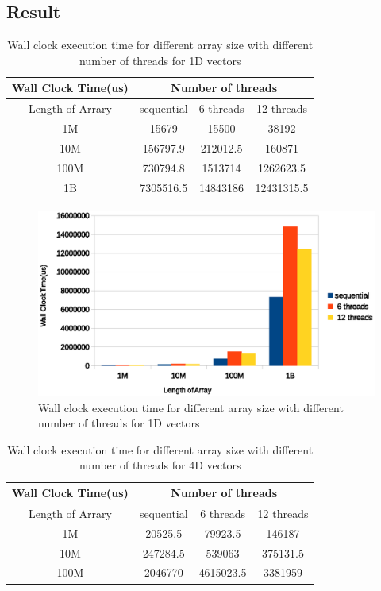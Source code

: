 \documentclass{article}
\begin{document}
\subsection{Result}
\begin{table}[h]
  \centering
  \begin{tabular}{|c|c|c|c|}
    \hline
    Wall Clock Time(us) & \multicolumn{3}{|c|}{Number of threads} \\
    \hline
    Length of Arrary & sequential & 6 threads & 12 threads \\
    \hline
    1M	& 15679	& 15500	& 38192 \\
    \hline
    10M	& 156797.9 & 212012.5 &	160871 \\
    \hline
    100M & 730794.8 & 1513714 &	1262623.5 \\
    \hline
    1B & 7305516.5 & 14843186 &	12431315.5 \\
    \hline
  \end{tabular}
  \caption{Wall clock execution time for different array size with different
    number of threads for 1D vectors}
  \label{table:1D_p2}
\end{table}

\begin{figure}[h]
  \centering
  \includegraphics[width=\textwidth]{fig/1D_p2}
  \caption{Wall clock execution time for different array size with
    different number of threads for 1D
    vectors}
  \label{fig:1D_p2}
\end{figure}

\begin{table}[h]
  \centering
  \begin{tabular}{|c|c|c|c|}
    \hline
    Wall Clock Time(us) & \multicolumn{3}{|c|}{Number of threads} \\
    \hline
    Length of Arrary & sequential & 6 threads & 12 threads \\
    \hline
    1M & 20525.5 & 79923.5 & 146187 \\
    \hline
    10M	& 247284.5 & 539063 & 375131.5 \\
    \hline
    100M & 2046770 & 4615023.5 & 3381959 \\
    \hline
  \end{tabular}
  \caption{Wall clock execution time for different array size with different
    number of threads for 4D vectors}
  \label{table:4D_p2}
\end{table}
\end{document}

